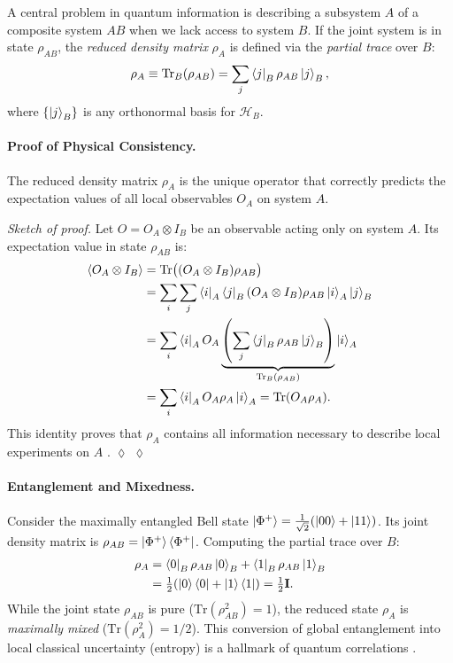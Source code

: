 \documentclass[aps, reprint, twocolumn, superscriptaddress, floatfix]{revtex4-2}
\newenvironment{proofsketch}[1][Sketch of proof]{%
  \par\smallskip\noindent\textit{#1.}\enspace}{%
  \hspace*{\fill}$\lozenge$\par\smallskip}
\begin{document}
A central problem in quantum information is describing a subsystem $A$ of a composite system $AB$ when we lack access to system $B$. If the joint system is in state $\rho_{AB}$, the \emph{reduced density matrix} $\rho_A$ is defined via the \emph{partial trace} over $B$:
\begin{equation}
  \rho_A \equiv \operatorname{Tr}_B(\rho_{AB}) = \sum_j \bra{j}_B \rho_{AB} \ket{j}_B,
  \label{eq:partial-trace}
\end{equation}
where $\{\ket{j}_B\}$ is any orthonormal basis for $\mathcal{H}_B$.

\paragraph{Proof of Physical Consistency.}
The reduced density matrix $\rho_A$ is the unique operator that correctly predicts the expectation values of all local observables $O_A$ on system $A$.
\begin{proofsketch}
Let $O = O_A \otimes I_B$ be an observable acting only on system $A$. Its expectation value in state $\rho_{AB}$ is:
\begin{align}
  \langle O_A \otimes I_B \rangle &= \operatorname{Tr}\bigl((O_A \otimes I_B) \rho_{AB}\bigr) \nonumber \\
  &= \sum_i \sum_j \bra{i}_A \bra{j}_B (O_A \otimes I_B) \rho_{AB} \ket{i}_A \ket{j}_B \nonumber \\
  &= \sum_i \bra{i}_A O_A \underbrace{\left( \sum_j \bra{j}_B \rho_{AB} \ket{j}_B \right)}_{\operatorname{Tr}_B(\rho_{AB})} \ket{i}_A \nonumber \\
  &= \sum_i \bra{i}_A O_A \rho_A \ket{i}_A = \operatorname{Tr}(O_A \rho_A). \nonumber
\end{align}
This identity proves that $\rho_A$ contains all information necessary to describe local experiments on $A$ \cite{wilde2017quantum}. $\lozenge$
\end{proofsketch}

\paragraph{Entanglement and Mixedness.}
Consider the maximally entangled Bell state $\ket{\Phi^+} = \tfrac{1}{\sqrt{2}}(\ket{00}+\ket{11})$. Its joint density matrix is $\rho_{AB} = \ket{\Phi^+}\bra{\Phi^+}$. Computing the partial trace over $B$:
\begin{align}
  \rho_A &= \bra{0}_B \rho_{AB} \ket{0}_B + \bra{1}_B \rho_{AB} \ket{1}_B \nonumber \\
  &= \tfrac{1}{2}(\ket{0}\bra{0} + \ket{1}\bra{1}) = \tfrac{1}{2}\mathbf{I}.
\end{align}
While the joint state $\rho_{AB}$ is pure ($\text{Tr}(\rho_{AB}^2)=1$), the reduced state $\rho_A$ is \emph{maximally mixed} ($\text{Tr}(\rho_A^2)=1/2$). This conversion of global entanglement into local classical uncertainty (entropy) is a hallmark of quantum correlations \cite{nielsen2010quantum}.
\end{document}
